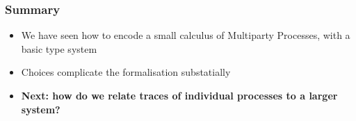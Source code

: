 \begin{frame}[fragile]
\frametitle{Summary}
\begin{sticky}
\begin{itemize}
\item We have seen how to encode a small calculus of Multiparty Processes, with a basic type system
\item Choices complicate the formalisation substatially
\item \textbf{Next: how do we relate traces of individual processes to a larger system?}
\end{itemize}
\end{sticky}
\end{frame}
